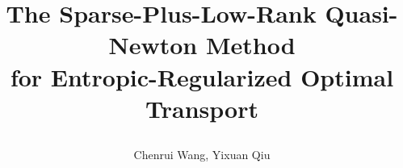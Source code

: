
\author{Chenrui Wang, Yixuan Qiu}
\title{
    \parbox{\linewidth}{
        \centering
        The Sparse-Plus-Low-Rank Quasi-Newton Method \\ for Entropic-Regularized Optimal Transport
    }
}

